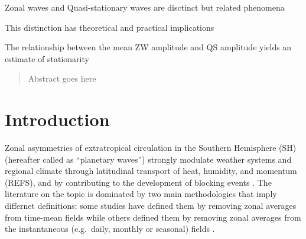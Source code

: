 \documentclass[draft,linenumbers]{agujournal2018}
\begin{document}



\begin{keypoints}
\item Zonal waves and Quasi-stationary waves are disctinct but related
phenomena
\item This distinction has theoretical and practical implications
\item The relationship between the mean ZW amplitude and QS amplitude yields
an estimate of stationarity
\end{keypoints}

%
%


\begin{abstract}
Abstract goes here
\end{abstract}

\section{Introduction}

Zonal asymmetries of extratropical circulation in the Southern
Hemisphere (SH) (hereafter called as ``planetary waves'') strongly
modulate weather systems and regional climate through latitudinal
transport of heat, humidity, and momentum (REFS), and by contributing to
the development of blocking events \citep[e.g.][]{Trenberth1985}. The
literature on the topic is dominated by two main methodologies that
imply differnet definitions: some studies have defined them by removing
zonal averages from time-mean fields
\citep[e.g.][\citet{Quintanar1995a}, \citet{Raphael2004}]{Loon1972}
while others defined them by removing zonal averages from the
instantaneous (e.g.~daily, monthly or seasonal) fields
\citep[e.g.][\citet{Turner2017}, \citet{Irving2015}]{Rao2004}.
\end{document}
